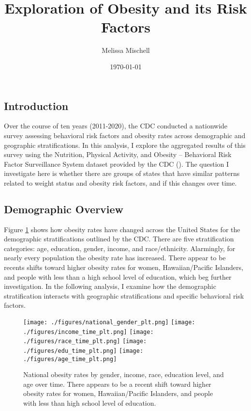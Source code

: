 \documentclass[11pt]{article}
\title{Exploration of Obesity and its Risk Factors}
\author{Melissa Mischell}
\date{\today}
\begin{document}
\maketitle

\subsection{Introduction}
Over the course of ten years (2011-2020), the CDC conducted a nationwide survey assessing behavioral risk factors and obesity rates across demographic and geographic stratifications. In this analysis, I explore the aggregated results of this survey using the Nutrition, Physical Activity, and Obesity – Behavioral Risk Factor Surveillance System dataset provided by the CDC (\cite{dataset}). The question I investigate here is whether there are groups of states that have similar patterns related to weight status and obesity risk factors, and if this changes over time. 

\subsection{Demographic Overview}
Figure \ref{fig:dems_by_time} shows how obesity rates have changed across the United States for the demographic stratifications outlined by the CDC. There are five stratification categories: age, education, gender, income, and race/ethnicity. Alarmingly, for nearly every population the obesity rate has increased. There appear to be recents shifts toward higher obesity rates for women, Hawaiian/Pacific Islanders, and people with less than a high school level of education, which beg further investigation. In the following analysis, I examine how the demographic stratification interacts with geographic stratifications and specific behavioral risk factors.

\begin{figure}[htbp]
\texttt{[image: ./figures/national\_gender\_plt.png]}
\texttt{[image: ./figures/income\_time\_plt.png]}
\texttt{[image: ./figures/race\_time\_plt.png]}
\texttt{[image: ./figures/edu\_time\_plt.png]}
\texttt{[image: ./figures/age\_time\_plt.png]}
\caption{
  National obesity rates by gender, income, race, education level, and age over time. There appears to be a recent shift toward higher obesity rates for women, Hawaiian/Pacific Islanders, and people with less than high school level of education. 
}
\label{fig:dems_by_time}
\end{figure}
\end{document}
